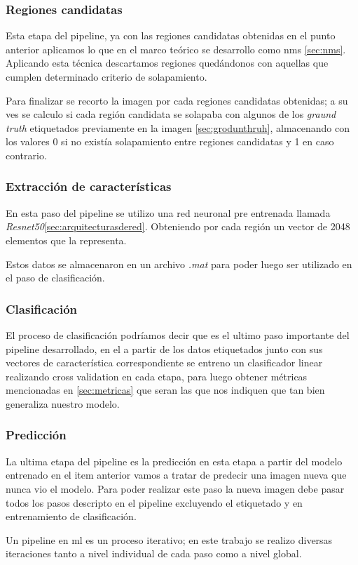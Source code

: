 \subsubsection*{Regiones candidatas}
Esta etapa del pipeline, ya con las regiones candidatas obtenidas en el punto anterior aplicamos lo que en el marco teórico se desarrollo como \ac{nms} \ref{sec:nms}. Aplicando esta técnica descartamos regiones quedándonos con aquellas que cumplen determinado criterio de solapamiento.

Para finalizar se recorto la imagen por cada regiones candidatas obtenidas; a su ves se calculo si cada región candidata se solapaba con algunos de los \textit{graund truth} etiquetados previamente en la imagen \ref{sec:grodunthruh}, almacenando con los valores 0 si no existía solapamiento entre regiones candidatas y 1 en caso contrario.

\subsubsection*{Extracción de características}
En esta paso del pipeline se utilizo una red neuronal pre entrenada llamada \textit{Resnet50}\ref{sec:arquitecturasdered}. Obteniendo por cada región un vector de 2048 elementos que la representa.

Estos datos se almacenaron en un archivo \textit{.mat} para poder luego ser utilizado en el paso de clasificación.

\subsubsection*{Clasificación}
El proceso de clasificación podríamos decir que es el ultimo paso importante del pipeline desarrollado, en el a partir de los datos etiquetados junto con sus vectores de característica correspondiente se entreno un clasificador linear realizando cross validation en cada etapa, para luego obtener métricas mencionadas en \ref{sec:metricas} que seran las que nos indiquen que tan bien generaliza nuestro modelo.

\subsubsection*{Predicción}
La ultima etapa del pipeline es la predicción en esta etapa a partir del modelo entrenado en el item anterior vamos a tratar de predecir una imagen nueva que nunca vio el modelo. Para poder realizar este paso la nueva imagen debe pasar todos los pasos descripto en el pipeline excluyendo el etiquetado y en entrenamiento de clasificación.



Un pipeline en \ac{ml} es un proceso iterativo; en este trabajo se realizo diversas iteraciones tanto a nivel individual de cada paso como a nivel global. 